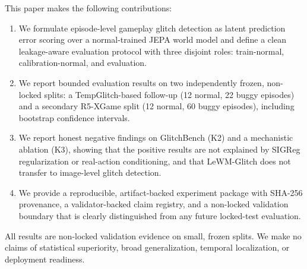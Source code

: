 This paper makes the following contributions:
\begin{enumerate}
  \item We formulate episode-level gameplay glitch detection as latent prediction error scoring
  over a normal-trained JEPA world model and define a clean leakage-aware evaluation protocol
  with three disjoint roles: train-normal, calibration-normal, and evaluation.
  \item We report bounded evaluation results on two independently frozen, non-locked splits:
  a TempGlitch-based follow-up (12 normal, 22 buggy episodes) and a secondary R5-XGame split
  (12 normal, 60 buggy episodes), including bootstrap confidence intervals.
  \item We report honest negative findings on GlitchBench (K2) and a mechanistic ablation (K3),
  showing that the positive results are not explained by SIGReg regularization or
  real-action conditioning, and that LeWM-Glitch does not transfer to image-level glitch detection.
  \item We provide a reproducible, artifact-backed experiment package with SHA-256 provenance,
  a validator-backed claim registry, and a non-locked validation boundary that is clearly
  distinguished from any future locked-test evaluation.
\end{enumerate}

All results are non-locked validation evidence on small, frozen splits.
We make no claims of statistical superiority, broad generalization, temporal localization,
or deployment readiness.
